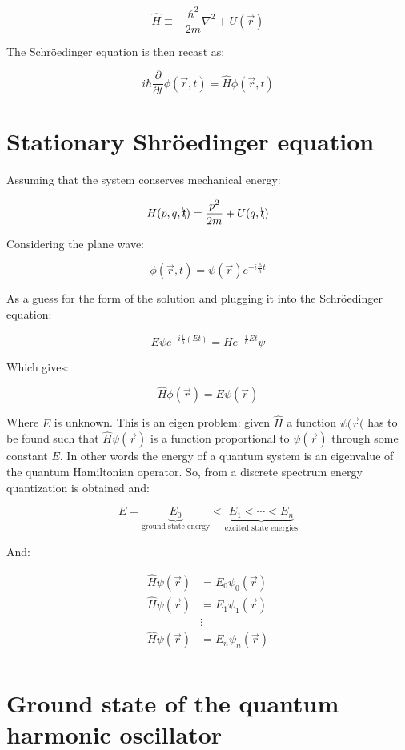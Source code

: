     $$\hat{H} \equiv -\frac{\hbar^2}{2m}\nabla^2+U(\vec{r})$$

    The Schr\"oedinger equation is then recast as:

    $$i\hbar \frac{\partial {}}{\partial {t}}\phi(\vec{r},t) = \hat{H} \phi(\vec{r},t)$$

\section{Stationary Shr\"oedinger equation}
Assuming that the system conserves mechanical energy:

$$H(p,q, \bcancel{t}) = \frac{p^2}{2m}+U(q,\bcancel{t})$$

Considering the plane wave:

$$\phi(\vec{r}, t) = \psi(\vec{r}) e^{-i \frac{E}{\hbar}t}$$

As a guess for the form of the solution and plugging it into the Schr\"oedinger equation:

$$E\psi e^{-i \frac{i}{\hbar}(Et)} = He^{-\frac{i}{\hbar}Et}\psi$$

Which gives:

$$\hat{H}\phi(\vec{r}) = E\psi(\vec{r})$$

Where $E$ is unknown.
This is an eigen problem: given $\hat{H}$ a function $\psi(\vec{r}($ has to be found such that $\hat{H}\psi(\vec{r})$ is a function proportional to $\psi(\vec{r})$ through some constant $E$.
In other words the energy of a quantum system is an eigenvalue of the quantum Hamiltonian operator.
So, from a discrete spectrum energy quantization is obtained and:

$$E = \underbrace{E_0}_{\text{ground state energy}} < \underbrace{E_1 < \cdots < E_n}_{\text{excited state energies}}$$

And:

\begin{align*}
  \hat{H}\psi(\vec{r}) &= E_0\psi_0(\vec{r})\\
  \hat{H}\psi(\vec{r}) &= E_1\psi_1(\vec{r})\\
                       &\vdots\\
  \hat{H}\psi(\vec{r}) &= E_n\psi_n(\vec{r})\\
\end{align*}

\section{Ground state of the quantum harmonic oscillator}

